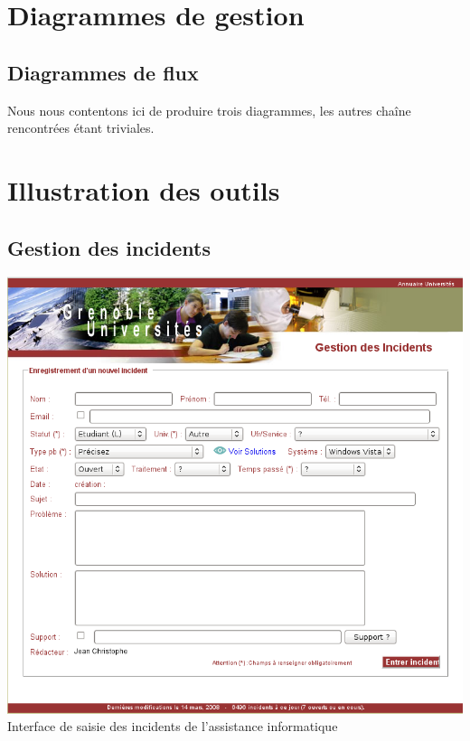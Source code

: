 \section{Diagrammes de gestion}

\subsection{Diagrammes de flux}

Nous nous contentons ici de produire trois diagrammes, les autres chaîne
rencontrées étant triviales.



\section{Illustration des outils}

\subsection{Gestion des incidents}
\label{gestion_incidents}
\begin{center}
	\includegraphics[width=15cm]{annexes/images/gestion_des_incidents.png} \\
	Interface de saisie des incidents de l'assistance informatique
\end{center}

